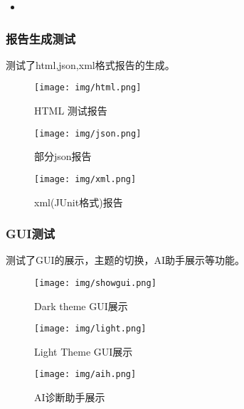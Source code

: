 \documentclass{article}
\begin{document}
\begin{itemize}
    \item
\end{itemize}
\subsubsection{报告生成测试}

测试了html,json,xml格式报告的生成。
\begin{figure}[H]
    \centering
    \texttt{[image: img/html.png]}
    \caption{HTML 测试报告}
    \label{fig: 数据驱动 function test}
\end{figure}
\begin{figure}[H]
    \centering
    \texttt{[image: img/json.png]}
    \caption{部分json报告}
    \label{fig: 数据驱动 function test}
\end{figure}

\begin{figure}[H]
    \centering
    \texttt{[image: img/xml.png]}
    \caption{xml(JUnit格式)报告}
    \label{fig: 数据驱动 function test}
\end{figure}
\subsubsection{GUI测试}
测试了GUI的展示，主题的切换，AI助手展示等功能。
\begin{figure}[H]
    \centering
    \begin{minipage}{0.5\textwidth}
        \texttt{[image: img/showgui.png]}
        \caption{Dark theme GUI展示}
        \label{fig:showgui}
    \end{minipage}%
    \begin{minipage}{0.5\textwidth}
        \texttt{[image: img/light.png]}
        \caption{Light Theme GUI展示}
        \label{fig:light}
    \end{minipage}
\end{figure}
\begin{figure}[H]
    \centering
    \texttt{[image: img/aih.png]}
    \caption{AI诊断助手展示}
    \label{fig: 数据驱动 function test}
\end{figure}
\end{document}
